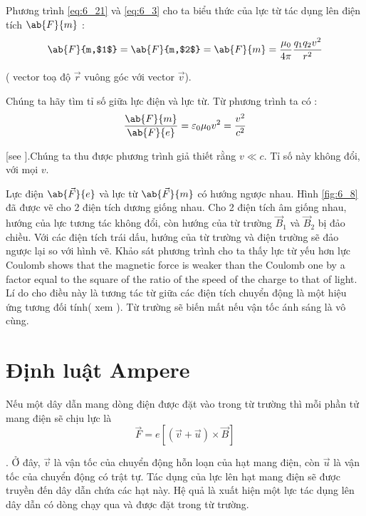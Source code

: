 Phương trình \eqref{eq:6_21} và \eqref{eq:6_3} cho ta biểu thức của lực từ tác dụng lên điện tích $\ab{F}{m}$ :
\begin{equation}\label{eq:6_38}
    \ab{F}{m,$1$} = \ab{F}{m,$2$} = \ab{F}{m} = \frac{\mu_0}{4\pi} \frac{q_1 q_2 v^2}{r^2}
\end{equation}

\noindent
( vector toạ độ $\vec{r}$ vuông góc với vector $\vec{v}$).

Chúng ta hãy tìm tỉ số giữa lực điện và lực từ. Từ phương trình  ta có :  
\begin{equation}\label{eq:6_39}
    \frac{\ab{F}{m}}{\ab{F}{e}} = \varepsilon_0 \mu_0 v^2 = \frac{v^2}{c^2}
\end{equation}

[see ].Chúng ta thu được phương trình  giả thiết rằng $v\ll c$. Tỉ số này không đổi, với mọi $v$.

Lực điện $\ab{\vec{F}}{e}$ và lực từ $\ab{\vec{F}}{m}$ có hướng ngược nhau. Hình \ref{fig:6_8} đã được vẽ cho 2 điện tích dương giống nhau. Cho 2 điện tích âm giống nhau, hướng của lực tương tác không đổi, còn hướng của từ trường $\vec{B}_1$ và $\vec{B}_2$ bị đảo chiều. Với các điện tích trái dấu, hướng của từ trường và điện trường sẽ đảo ngược lại so với hình vẽ.
Khảo sát phương trình  cho ta thấy lực từ yếu hơn lực Coulomb    shows that the magnetic force is weaker than the Coulomb one by a factor equal to the square of the ratio of the speed of the charge to that of light. Lí do cho điều này là tương tác từ giữa các điện tích chuyển động là một hiệu ứng tương đối tính( xem  ). Từ trường sẽ biến mất nếu vận tốc ánh sáng là vô cùng.

\section{Định luật Ampere}\label{sec:6_6}

Nếu một dây dẫn mang dòng điện được đặt vào trong từ trường thì mỗi phần tử mang điện sẽ chịu lực là
\begin{equation}\label{eq:6_40}
    \vec{F} = e [(\vec{v} + \vec{u}) \times \vec{B}]
\end{equation}

. Ở đây, $\vec{v}$ là vận tốc của chuyển động hỗn loạn của hạt mang điện, còn $\vec{u}$ là vận tốc của chuyển động có trật tự. Tác dụng của lực lên hạt mang điện sẽ được truyền đến dây dẫn chứa các hạt này. Hệ quả là xuất hiện một lực tác dụng lên dây dẫn có dòng chạy qua và được đặt trong từ trường.

